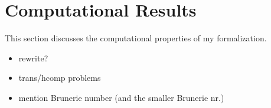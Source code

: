 \section{Computational Results}

This section discusses the computational properties of my formalization.

\begin{itemize}
\item rewrite?
\item trans/hcomp problems
  \item mention Brunerie number (and the smaller Brunerie nr.)
\end{itemize}